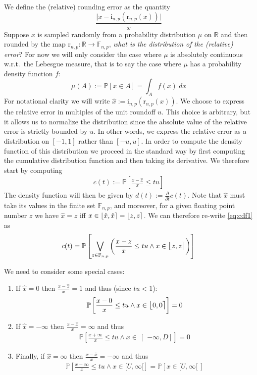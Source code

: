 \documentclass[10pt,a4paper]{article}
\theoremstyle{plain}
\theoremstyle{definition}
\newcommand{\wrt}{w.r.t.\ }
\newcommand{\F}[1][n,p]{\mathbb{F}_{#1}}
\newcommand{\R}{\mathbb{R}}
\newcommand{\Rep}[1][n,p]{\mathrm{i}_{#1}}
\newcommand{\Round}[1][n,p]{\mathrm{r}_{#1}}
\newcommand{\fintvl}[1][x]{\mathlarger{\lfloor}#1,#1\mathlarger{\rceil}}
\newcommand{\absv}[1]{\vert #1\vert}
\newcommand{\Pro}[1]{\mathbb{P}\left[ #1 \right]}
\newcommand{\dt}{\frac{\partial}{\partial t}}
\begin{document}
We define the (relative) rounding error as the quantity
\[
\frac{\absv{x-\Rep(\Round(x))}}{x}
\]
Suppose $x$ is sampled randomly from a probability distribution $\mu$ on $\R$ and then rounded by the map $\Round:\R\to\F$, \emph{what is the distribution of the (relative) error}? For now we will only consider the case where $\mu$ is absolutely continuous \wrt the Lebesgue measure, that is to say the case where $\mu$ has a probability density function $f$:
\[
\mu(A):=\Pro{x\in A}=\int_Af(x)~dx
\]
For notational clarity we will write $\hat{x}:=\Rep(\Round(x))$. We choose to express the relative error in multiples of the unit roundoff $u$. This choice is arbitrary, but it allows us to normalize the distribution since the absolute value of the relative error is strictly bounded by $u$. In other words, we express the relative error as a distribution on $[-1,1]$ rather than $[-u,u]$. In order to compute the density function of this distribution we proceed in the standard way by first computing the cumulative distribution function and then taking its derivative. We therefore start by computing
\begin{align}\label{eq:cdf1}
c(t):=\Pro{\frac{x-\hat{x}}{x}\leq tu}
\end{align}
The density function will then be given by $d(t):=\dt c(t)$. Note that $\hat{x}$ must take its values in the finite set $\F$, and moreover, for a given floating point number $z$ we have $\hat{x}=z$ iff $x\in \fintvl[\hat{x}]=\fintvl[z]$. We can therefore re-write \eqref{eq:cdf1} as
\begin{align}\label{eq:cdf2}
c(t)=\Pro{\bigvee_{z\in\F}\left(\frac{x-z}{x}\leq tu\wedge x\in \fintvl[z]\right)}
\end{align}

We need to consider some special cases:
\begin{enumerate}
\item If $\hat{x}=0$ then $\frac{x-\hat{x}}{x}=1$ and thus (since $tu<1$):
\begin{align}\label{eq:cdfnot0}
\Pro{\frac{x-0}{x}\leq tu\wedge x\in \fintvl[0]}=0
\end{align}
\item If $\hat{x}=-\infty$ then $\frac{x-\hat{x}}{x}=\infty$ and thus 
\begin{align}\label{eq:cdfnotminf}
\Pro{\frac{x+\infty}{x}\leq tu\wedge x\in \left]-\infty,D\right]}=0
\end{align}
\item Finally, if $\hat{x}=\infty$ then $\frac{x-\hat{x}}{x}=-\infty$ and thus 
\begin{align}\label{eq:cdfpinf}
\Pro{\frac{x-\infty}{x}\leq tu\wedge x\in [U,\infty[}=\Pro{x\in [U,\infty[~}
\end{align}
\end{enumerate}
\end{document}

